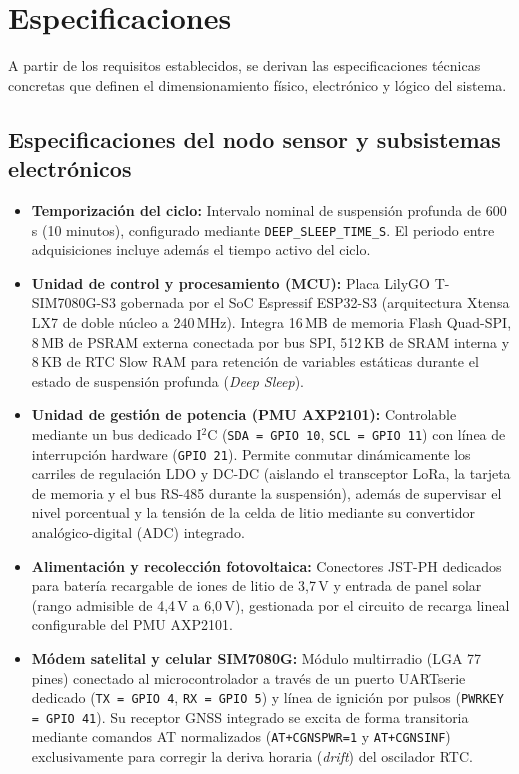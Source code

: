 \section{Especificaciones}

A partir de los requisitos establecidos, se derivan las especificaciones técnicas concretas que definen el dimensionamiento físico, electrónico y lógico del sistema.

\subsection{Especificaciones del nodo sensor y subsistemas electrónicos}
\begin{itemize}
    \item \textbf{Temporización del ciclo:} Intervalo nominal de suspensión profunda de 600\,s (10 minutos), configurado mediante \texttt{DEEP\_SLEEP\_TIME\_S}. El periodo entre adquisiciones incluye además el tiempo activo del ciclo.
    \item \textbf{Unidad de control y procesamiento (MCU):} Placa LilyGO T-SIM7080G-S3 gobernada por el SoC Espressif ESP32-S3 (arquitectura Xtensa LX7 de doble núcleo a 240\,MHz). Integra 16\,MB de memoria Flash Quad-SPI, 8\,MB de PSRAM externa conectada por bus SPI, 512\,KB de SRAM interna y 8\,KB de RTC Slow RAM para retención de variables estáticas durante el estado de suspensión profunda (\textit{Deep Sleep}).
    
    \item \textbf{Unidad de gestión de potencia (PMU AXP2101):} Controlable mediante un bus dedicado I$^2$C (\texttt{SDA = GPIO 10}, \texttt{SCL = GPIO 11}) con línea de interrupción hardware (\texttt{GPIO 21}). Permite conmutar dinámicamente los carriles de regulación LDO y DC-DC (aislando el transceptor LoRa, la tarjeta de memoria y el bus RS-485 durante la suspensión), además de supervisar el nivel porcentual y la tensión de la celda de litio mediante su convertidor analógico-digital (ADC) integrado.
    
    \item \textbf{Alimentación y recolección fotovoltaica:} Conectores JST-PH dedicados para batería recargable de iones de litio de 3,7\,V y entrada de panel solar (rango admisible de 4,4\,V a 6,0\,V), gestionada por el circuito de recarga lineal configurable del PMU AXP2101.
    
    \item \textbf{Módem satelital y celular SIM7080G:} Módulo multirradio (LGA 77 pines) conectado al microcontrolador a través de un puerto UARTserie dedicado (\texttt{TX = GPIO 4}, \texttt{RX = GPIO 5}) y línea de ignición por pulsos (\texttt{PWRKEY = GPIO 41}). Su receptor GNSS integrado se excita de forma transitoria mediante comandos AT normalizados (\texttt{AT+CGNSPWR=1} y \texttt{AT+CGNSINF}) exclusivamente para corregir la deriva horaria (\textit{drift}) del oscilador RTC.
    

\end{itemize}
